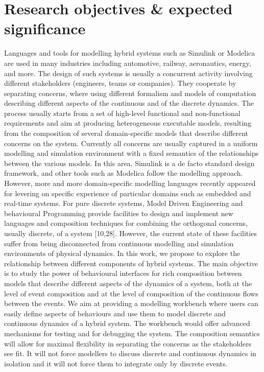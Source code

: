 \documentclass[11pt]{article}
\begin{document}
\section{Research objectives \& expected significance}  
Languages and tools for modelling hybrid systems such as Simulink or Modelica are used in many industries including automotive, railway, aeronautics, energy, and more. The design of such systems is usually a concurrent activity involving different stakeholders (engineers, teams or companies). They cooperate by separating concerns, where using different formalism and models of computation describing different aspects of the continuous and of the discrete dynamics. The process usually starts  from a set of high-level functional and non-functional requirements and aim at producing heterogeneous executable models, resulting from the composition of several domain-specific models that describe different concerns on the system.
Currently all concerns are usually captured in a uniform modelling and simulation environment with a fixed semantics of the relationships between the various models. In this area, Simulink is a de facto standard design framework, and other tools such as Modelica follow the modelling approach. However, more and more domain-specific modelling languages recently appeared for levering on specific experience of particular domains such as embedded and real-time systems. For pure discrete systems, Model Driven Engineering and behavioural Programming provide facilities to design and implement new languages and composition techniques for combining the orthogonal concerns, usually discrete, of a system [10,28]. However, the current state of these facilities suffer from being disconnected from continuous modelling and simulation environments of physical dynamics.
In this work, we propose to explore the relationship between different components of hybrid systems. The main objective is to study the power of behavioural interfaces for rich composition between models that describe different aspects of the dynamics of a system, both at the level of event composition and at the level of composition of the continuous flows between the events.
We aim at providing a modelling workbench where users can easily define aspects of behaviours and use them to model discrete and continuous dynamics of a hybrid system. The workbench would offer advanced mechanisms for testing and for debugging the system. The composition semantics will allow for maximal flexibility in separating the concerns as the stakeholders see fit. It will not force modellers to discuss discrete and continuous dynamics in isolation and it will not force them to integrate only by discrete events.
\end{document}
